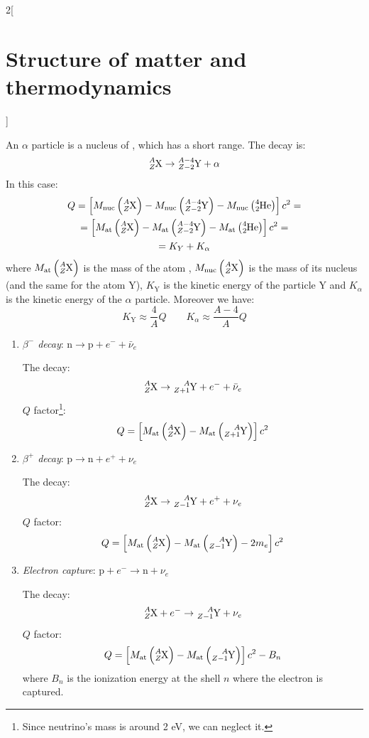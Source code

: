 \documentclass[../../../main_physics.tex]{subfiles}
\begin{document}
\begin{multicols}{2}[\section{Structure of matter and thermodynamics}]
\begin{definition}[Q value]
  \end{definition}
  \begin{definition}
    An $\alpha$ particle is a nucleus of , which has a short range.
    The decay is: $$\ce{^$A$_$Z$X}\rightarrow\ce{^$A-4$_$Z-2$Y}+\alpha$$
    In this case:
    \begin{multline*}
      Q=\left[M_\text{nuc}\left(\ce{^$A$_$Z$X}\right)-M_\text{nuc}\left(\ce{^$A-4$_$Z-2$Y}\right)-M_\text{nuc}\left(\ce{^4_2He}\right)\right]c^2=\\=\left[M_\text{at}\left(\ce{^$A$_$Z$X}\right)-M_\text{at}\left(\ce{^$A-4$_$Z-2$Y}\right)-M_\text{at}\left(\ce{^4_2He}\right)\right]c^2=\\=K_Y+K_\alpha
    \end{multline*}
    where $M_\text{at}\left(\ce{^$A$_$Z$X}\right)$ is the mass of the atom , $M_\text{nuc}\left(\ce{^$A$_$Z$X}\right)$ is the mass of its nucleus (and the same for the atom Y), $K_\text{Y}$ is the kinetic energy of the particle Y and $K_\alpha$ is the kinetic energy of the $\alpha$ particle. Moreover we have: $$K_\text{Y}\approx \frac{4}{A}Q\qquad K_\alpha\approx \frac{A-4}{A}Q$$
  \end{definition}
  \begin{definition}
    \hfill
    \begin{enumerate}
      \item \emph{$\beta^-$ decay}: $\text{n}\rightarrow\text{p}+e^-+\bar{\nu}_e$\par
            The decay: $$\ce{^$A$_$Z$X}\rightarrow\ce{^$A$_$Z+1$Y}+e^-+\bar{\nu}_e$$
            $Q$ factor\footnote{Since neutrino's mass is around 2 eV, we can neglect it.}: $$Q=\left[M_\text{at}\left(\ce{^$A$_$Z$X}\right)-M_\text{at}\left(\ce{^$A$_$Z+1$Y}\right)\right]c^2$$
      \item \emph{$\beta^+$ decay}: $\text{p}\rightarrow\text{n}+e^++\nu_e$\par
            The decay: $$\ce{^$A$_$Z$X}\rightarrow\ce{^$A$_$Z-1$Y}+e^++\nu_e$$
            $Q$ factor: $$Q=\left[M_\text{at}\left(\ce{^$A$_$Z$X}\right)-M_\text{at}\left(\ce{^$A$_$Z-1$Y}\right)-2m_e\right]c^2$$
      \item \emph{Electron capture}: $\text{p}+e^-\rightarrow\text{n}+\nu_e$\par
            The decay: $$\ce{^$A$_$Z$X}+e^-\rightarrow\ce{^$A$_$Z-1$Y}+\nu_e$$
            $Q$ factor: $$Q=\left[M_\text{at}\left(\ce{^$A$_$Z$X}\right)-M_\text{at}\left(\ce{^$A$_$Z-1$Y}\right)\right]c^2-B_n$$
            where $B_n$ is the ionization energy at the shell $n$ where the electron is captured.

\end{enumerate}
\end{definition}
\end{multicols}
\end{document}

